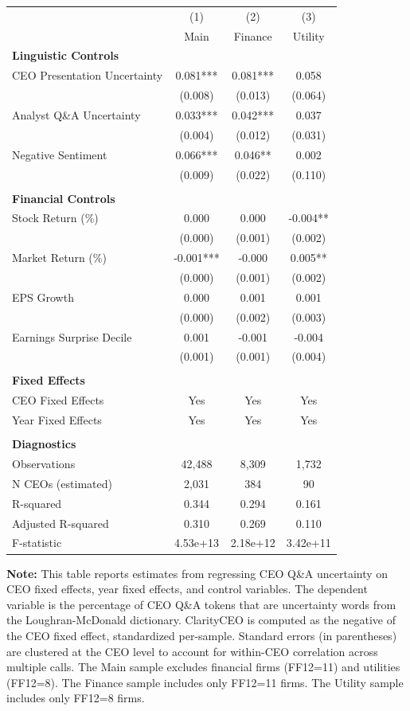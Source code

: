 \begin{table}[htbp]
\begin{tabular}{@{}lccc@{}}
\toprule
 & (1) & (2) & (3) \\
 & Main & Finance & Utility \\
\midrule
\textbf{Linguistic Controls} & & & \\
CEO Presentation Uncertainty & 0.081*** & 0.081*** & 0.058 \\
 & (0.008) & (0.013) & (0.064) \\
Analyst Q\&A Uncertainty & 0.033*** & 0.042*** & 0.037 \\
 & (0.004) & (0.012) & (0.031) \\
Negative Sentiment & 0.066*** & 0.046** & 0.002 \\
 & (0.009) & (0.022) & (0.110) \\
\\
\textbf{Financial Controls} & & & \\
Stock Return (\%) & 0.000 & 0.000 & -0.004** \\
 & (0.000) & (0.001) & (0.002) \\
Market Return (\%) & -0.001*** & -0.000 & 0.005** \\
 & (0.000) & (0.001) & (0.002) \\
EPS Growth & 0.000 & 0.001 & 0.001 \\
 & (0.000) & (0.002) & (0.003) \\
Earnings Surprise Decile & 0.001 & -0.001 & -0.004 \\
 & (0.001) & (0.001) & (0.004) \\
\\
\midrule
\textbf{Fixed Effects} & & & \\
CEO Fixed Effects & Yes & Yes & Yes \\
Year Fixed Effects & Yes & Yes & Yes \\
\\
\midrule
\textbf{Diagnostics} & & & \\
Observations & 42,488 & 8,309 & 1,732 \\
N CEOs (estimated) & 2,031 & 384 & 90 \\
R-squared & 0.344 & 0.294 & 0.161 \\
Adjusted R-squared & 0.310 & 0.269 & 0.110 \\
F-statistic & 4.53e+13 & 2.18e+12 & 3.42e+11 \\
\bottomrule
\end{tabular}

\begin{tablenotes}[flushleft]\footnotesize
\item \textbf{Note:} This table reports estimates from regressing CEO Q\&A uncertainty on CEO fixed effects, year fixed effects, and control variables. The dependent variable is the percentage of CEO Q\&A tokens that are uncertainty words from the Loughran-McDonald dictionary. ClarityCEO is computed as the negative of the CEO fixed effect, standardized per-sample. Standard errors (in parentheses) are clustered at the CEO level to account for within-CEO correlation across multiple calls. The Main sample excludes financial firms (FF12=11) and utilities (FF12=8). The Finance sample includes only FF12=11 firms. The Utility sample includes only FF12=8 firms.


\end{tablenotes}
\end{table}

